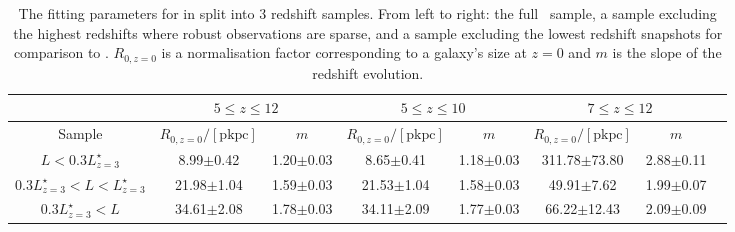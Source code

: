 \begin{table}
\begin{center}
\begin{tabular}{ c | c | c | c | c | c | c | c }
 \hline
   & \multicolumn{2}{|c|}{$5 \leq z \leq 12$} & \multicolumn{2}{|c|}{$5 \leq z \leq 10$} & \multicolumn{2}{|c|}{$7 \leq z \leq 12$} \\ \hline
 Sample & $R_{0,z=0}/ [\mathrm{pkpc}]$ & $m$ & $R_{0,z=0}/ [\mathrm{pkpc}]$ & $m$ &  $R_{0,z=0}/ [\mathrm{pkpc}]$ & $m$ \\ \hline
 $L<0.3L_{z=3}^{\star}$ 
 & 8.99$\pm$0.42  & 1.20$\pm$0.03
 & 8.65$\pm$0.41  & 1.18$\pm$0.03
 & 311.78$\pm$73.80 & 2.88$\pm$0.11\\  
 $0.3L_{z=3}^{\star}<L<L_{z=3}^{\star}$ 
 & 21.98$\pm$1.04  & 1.59$\pm$0.03
 & 21.53$\pm$1.04   & 1.58$\pm$0.03
 & 49.91$\pm$7.62  & 1.99$\pm$0.07 \\ 
 $0.3L_{z=3}^{\star}<L$ 
 & 34.61$\pm$2.08  & 1.78$\pm$0.03
 & 34.11$\pm$2.09  & 1.77$\pm$0.03
 & 66.22$\pm$12.43  & 2.09$\pm$0.09\\ 
 \hline
\end{tabular}
\caption{The fitting parameters for  in  split into 3 redshift samples. From left to right: the full \flares\ sample, a sample excluding the highest redshifts where robust observations are sparse, and a sample excluding the lowest redshift snapshots for comparison to \bluetides. $R_{0,z=0}$ is a normalisation factor corresponding to a galaxy's size at $z=0$ and $m$ is the slope of the redshift evolution.}
\label{tab:evo}
\end{center}
\end{table}


